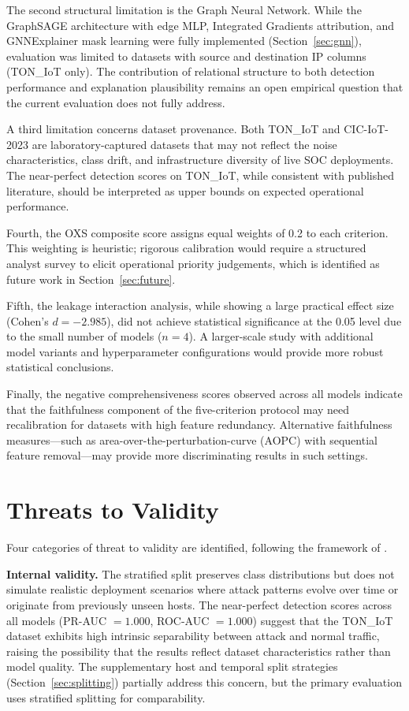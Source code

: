 \documentclass[12pt,a4paper]{report}
\begin{document}
The second structural limitation is the Graph Neural Network. While the GraphSAGE architecture with edge MLP, Integrated Gradients attribution, and GNNExplainer mask learning were fully implemented (Section~\ref{sec:gnn}), evaluation was limited to datasets with source and destination IP columns (TON\_IoT only). The contribution of relational structure to both detection performance and explanation plausibility remains an open empirical question that the current evaluation does not fully address.

A third limitation concerns dataset provenance. Both TON\_IoT and CIC-IoT-2023 are laboratory-captured datasets that may not reflect the noise characteristics, class drift, and infrastructure diversity of live SOC deployments. The near-perfect detection scores on TON\_IoT, while consistent with published literature, should be interpreted as upper bounds on expected operational performance.

Fourth, the OXS composite score assigns equal weights of 0.2 to each criterion. This weighting is heuristic; rigorous calibration would require a structured analyst survey to elicit operational priority judgements, which is identified as future work in Section~\ref{sec:future}.

Fifth, the leakage interaction analysis, while showing a large practical effect size (Cohen's $d = -2.985$), did not achieve statistical significance at the 0.05 level due to the small number of models ($n = 4$). A larger-scale study with additional model variants and hyperparameter configurations would provide more robust statistical conclusions.

Finally, the negative comprehensiveness scores observed across all models indicate that the faithfulness component of the five-criterion protocol may need recalibration for datasets with high feature redundancy. Alternative faithfulness measures---such as area-over-the-perturbation-curve (AOPC) with sequential feature removal---may provide more discriminating results in such settings.

\section{Threats to Validity}
\label{sec:threats}

Four categories of threat to validity are identified, following the framework of \citet{deyoung2020}.

\textbf{Internal validity.} The stratified split preserves class distributions but does not simulate realistic deployment scenarios where attack patterns evolve over time or originate from previously unseen hosts. The near-perfect detection scores across all models (PR-AUC $= 1.000$, ROC-AUC $= 1.000$) suggest that the TON\_IoT dataset exhibits high intrinsic separability between attack and normal traffic, raising the possibility that the results reflect dataset characteristics rather than model quality. The supplementary host and temporal split strategies (Section~\ref{sec:splitting}) partially address this concern, but the primary evaluation uses stratified splitting for comparability.
\end{document}
